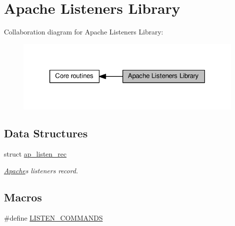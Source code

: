 \hypertarget{group__APACHE__CORE__LISTEN}{}\section{Apache Listeners Library}
\label{group__APACHE__CORE__LISTEN}
Collaboration diagram for Apache Listeners Library\+:
\nopagebreak
\begin{figure}[H]
\begin{center}
\leavevmode
\includegraphics[width=316pt]{group__APACHE__CORE__LISTEN}
\end{center}
\end{figure}
\subsection*{Data Structures}
\begin{DoxyCompactItemize}
\item 
struct \hyperlink{structap__listen__rec}{ap\+\_\+listen\+\_\+rec}
\begin{DoxyCompactList}\small\item\em \hyperlink{namespaceApache}{Apache}\textquotesingle{}s listeners record. \end{DoxyCompactList}\end{DoxyCompactItemize}
\subsection*{Macros}
\begin{DoxyCompactItemize}
\item 
\#define \hyperlink{group__APACHE__CORE__LISTEN_ga78110887c0bb52b5ed1ca01068dad0b1}{L\+I\+S\+T\+E\+N\+\_\+\+C\+O\+M\+M\+A\+N\+DS}
\end{DoxyCompactItemize}
